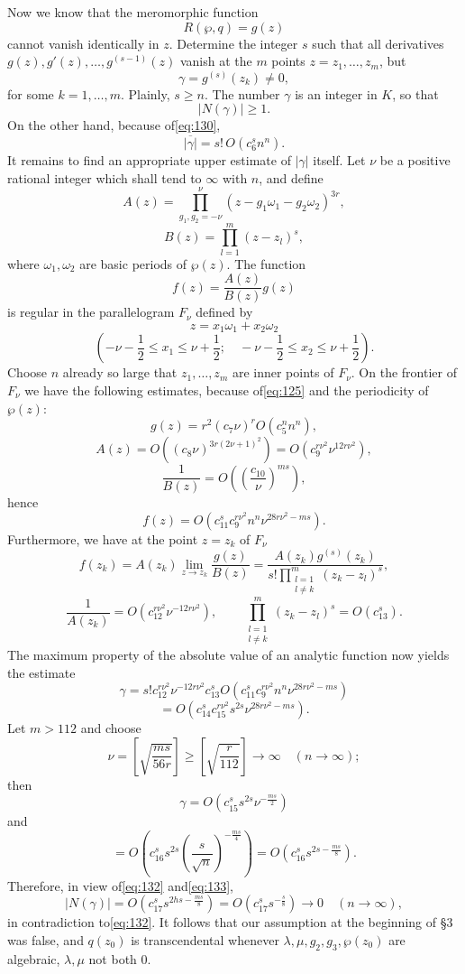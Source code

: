 Now we know that the meromorphic function
\[
R(\wp, q) = g(z)
\]
cannot vanish identically in $z$. Determine the integer $s$ such that all derivatives $g(z), g'(z), \dots, g^{(s-1)}(z)$ vanish at the $m$ points $z = z_1, \dots, z_m$, but
\[
\gamma = g^{(s)}(z_k) \neq 0,
\]
for some $k=1, \dots, m$. Plainly, $s \ge n$. The number $\gamma$ is an integer in $K$, so that
\begin{equation}
|N(\gamma)| \ge 1. \tag{132}\label{eq:132}
\end{equation}
On the other hand, because of\eqref{eq:130},
\begin{equation}
\overline{|\gamma|} = s! \, O(c_6^s n^n). \tag{133}\label{eq:133}
\end{equation}
It remains to find an appropriate upper estimate of $|\gamma|$ itself. Let $\nu$ be a positive rational integer which shall tend to $\infty$ with $n$, and define
\[
A(z) = \prod_{g_1, g_2 = -\nu}^{\nu} (z - g_1 \omega_1 - g_2 \omega_2)^{3r},
\]
\[
B(z) = \prod_{l=1}^{m} (z-z_l)^{s},
\]
where $\omega_1, \omega_2$ are basic periods of $\wp(z)$. The function
\[
f(z) = \frac{A(z)}{B(z)} g(z)
\]
is regular in the parallelogram $F_\nu$ defined by
\[
z = x_{1}\omega_{1} + x_{2}\omega_{2}
\]
\[
(-\nu - \frac{1}{2} \le x_{1} \le \nu + \frac{1}{2}; \quad -\nu - \frac{1}{2} \le x_{2} \le \nu + \frac{1}{2}).
\]
Choose $n$ already so large that $z_1, \dots, z_m$ are inner points of $F_{\nu}$. On the frontier of $F_{\nu}$ we have the following estimates, because of\eqref{eq:125} and the periodicity of $\wp(z)$:
\[
g(z) = r^2 (c_7 \nu)^r O(c_5^n n^n),
\]
\[
A(z) = O((c_8 \nu)^{3r(2\nu+1)^2}) = O(c_9^{r\nu^2} \nu^{12r\nu^2}),
\]
\[
\frac{1}{B(z)} = O\left(\left(\frac{c_{10}}{\nu}\right)^{ms}\right),
\]
hence
\[
f(z) = O(c_{11}^s c_9^{r\nu^2} n^n \nu^{28r\nu^2 - ms}).
\]
Furthermore, we have at the point $z=z_k$ of $F_{\nu}$
\[
f(z_k) = A(z_k) \lim_{z \to z_k} \frac{g(z)}{B(z)} = \frac{A(z_k)g^{(s)}(z_k)}{s! \prod_{\substack{l=1\\l \neq k}}^{m} (z_k-z_l)^s},
\]
\[
\frac{1}{A(z_k)} = O(c_{12}^{r\nu^2} \nu^{-12r\nu^2}), \qquad \prod_{\substack{l=1\\l \neq k}}^m (z_k - z_l)^s = O(c_{13}^s).
\]
The maximum property of the absolute value of an analytic function now yields the estimate
\[
\gamma = s! c_{12}^{r\nu^2} \nu^{-12r\nu^2} c_{13}^s O(c_{11}^s c_9^{r\nu^2} n^n \nu^{28r\nu^2 - ms})
\]
\[
= O(c_{14}^s c_{15}^{r\nu^2} s^{2s} \nu^{28r\nu^2 - ms}).
\]
Let $m > 112$ and choose
\[
\nu = \left[ \sqrt{\frac{ms}{56r}} \right] \ge \left[ \sqrt{\frac{r}{112}} \right] \to \infty \quad (n \to \infty);
\]
then
\[
\gamma = O(c_{15}^s s^{2s} \nu^{-\frac{ms}{2}})
\]
and
\[
= O\left(c_{16}^s s^{2s} \left(\frac{s}{\sqrt{n}}\right)^{-\frac{ms}{4}}\right) = O\left(c_{16}^s s^{2s-\frac{ms}{8}}\right).
\]
Therefore, in view of\eqref{eq:132} and\eqref{eq:133},
\[
|N(\gamma)| = O\left(c_{17}^s s^{2hs - \frac{ms}{8}}\right) = O\left(c_{17}^s s^{-\frac{s}{8}}\right) \to 0 \quad (n \to \infty),
\]
in contradiction to\eqref{eq:132}. It follows that our assumption at the beginning of \S 3 was false, and $q(z_0)$ is transcendental whenever $\lambda, \mu, g_2, g_3, \wp(z_0)$ are algebraic, $\lambda, \mu$ not both 0.


